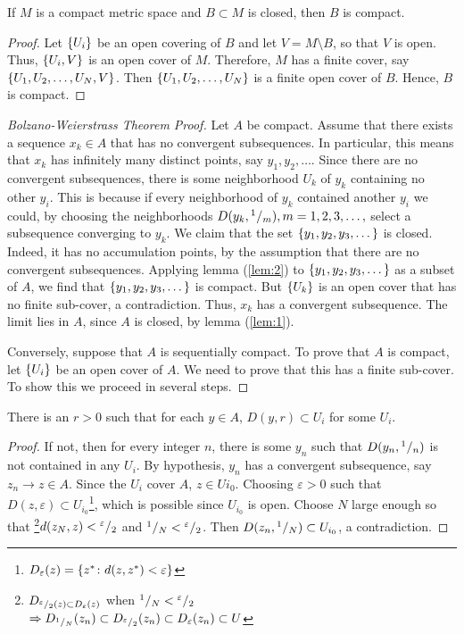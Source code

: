 \documentclass[../main-sheet.tex]{subfiles}
\begin{document}
\begin{lem}
    \label{lem:2}
    If $ M $ is a compact metric space and $ B\subset M $ is closed, then $ B $ is compact.
\end{lem}
\begin{proof}
    Let $ \left\{U_i\right\} $ be an open covering of $ B $ and let $ V=M\setminus B $, so that $ V $ is open. Thus, $ \left\{U_i,V\right\} $ is an open cover of $ M $. Therefore, $ M $ has a finite cover, say $ \left\{U_1,U_2,\dots,U_N,V\right\} $. Then $ \left\{U_1,U_2,\dots,U_N\right\} $ is a finite open cover of $ B $. Hence, $ B $ is compact.
\end{proof}
\begin{proof}[Bolzano-Weierstrass  Theorem Proof]
    Let $ A $ be compact. Assume that there exists a sequence $ x_k\in A $ that has no convergent subsequences. In particular, this means that $ x_k $ has infinitely many distinct points, say $ y_1,y_2,\dots $. Since there are no convergent subsequences, there is some neighborhood $ U_k $ of $ y_k $ containing no other $ y_i $. This is because if every neighborhood of $ y_k $ contained another $ y_i $ we could, by choosing the neighborhoods $ D(y_k,{}^{1}/{}_{m}),m=1,2,3,\dots, $ select a subsequence converging to $ y_k $. We claim that the set $ \left\{y_1,y_2,y_3,\dots\right\} $ is closed. Indeed, it has no accumulation points, by the assumption that there are no convergent subsequences. Applying lemma (\ref{lem:2}) to $ \left\{y_1,y_2,y_3,\dots\right\} $ as a subset of $ A $, we find that $ \left\{y_1,y_2,y_3,\dots\right\} $ is compact. But $ \left\{U_k\right\} $ is an open cover that has no finite sub-cover, a contradiction. Thus, $ x_k $ has a convergent subsequence. The limit lies in $ A $, since $ A $ is closed, by lemma (\ref{lem:1}).\par

    Conversely, suppose that $ A $ is sequentially compact. To prove that $ A $ is compact, let $ \left\{U_i\right\} $ be an open cover of $ A $. We need to prove that this has a finite sub-cover. To show this we proceed in several steps.
\end{proof}
\begin{lem}
    \label{lem:3}
    There is an $ r>0 $ such that for each $ y\in A $, $ D(y,r)\subset U_i $ for some $ U_i $.
\end{lem}
\begin{proof}
    If not, then for every integer $ n $, there is some $ y_n $ such that $ D(y_n,{}^{1}/{}_{n}) $ is not contained in any $ U_i $. By hypothesis, $ y_n $ has a convergent subsequence, say $ z_n\to z\in A $. Since the $ U_i $ cover $ A $, $ z\in U{i_0} $. Choosing $ \varepsilon>0 $ such that $ D(z,\varepsilon)\subset U_{i_0} $\footnote{$ D_\varepsilon(z)=\left\{z^*\colon d(z,z^*)<\varepsilon\right\} $}, which is possible since $ U_{i_0} $ is open. Choose $ N $ large enough so that \footnote{$ D_{{}^{\varepsilon}/{}_{2}(z)\subset D_\varepsilon(z)} $ when $ {}^{1}/{}_{N}<{}^{\varepsilon}/{}_{2} $\\$ \Rightarrow D_{{}^{1}/{}_{N}}(z_n)\subset D_{{}^{\varepsilon}/{}_{2}}(z_n) \subset D_{\varepsilon}(z_n)\subset U$}$ d(z_N,z)<{}^{\varepsilon}/{}_{2} $ and $ {}^{1}/{}_{N}<{}^{\varepsilon}/{}_{2} $. Then $ D(z_n,{}^{1}/{}_{N})\subset U_{i_0} $, a contradiction.
\end{proof}
\end{document}
